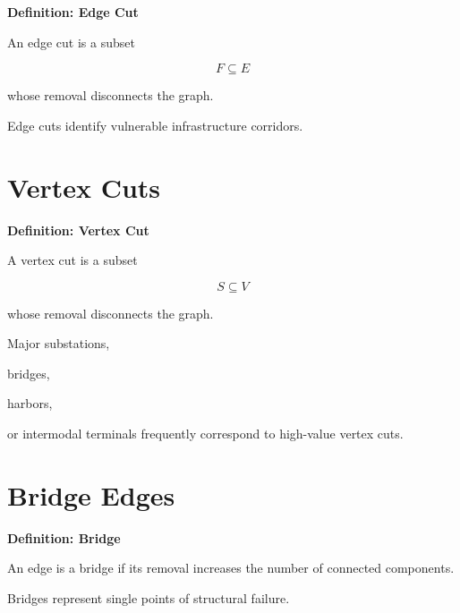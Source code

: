 \documentclass[11pt,fleqn]{book}
\numberwithin{equation}{chapter}
\newenvironment{definition}[1]
  {\begin{definitionEnv}
   \noindent\textbf{Definition: #1}\par\smallskip}
  {\end{definitionEnv}}
\theoremstyle{plain}
\theoremstyle{definition}
\theoremstyle{remark}
\begin{document}

\begin{definition}{Edge Cut}

An edge cut is a subset

\[
F\subseteq E
\]

whose removal disconnects the graph.

\end{definition}

Edge cuts identify vulnerable infrastructure corridors.


\section{Vertex Cuts}


\begin{definition}{Vertex Cut}

A vertex cut is a subset

\[
S\subseteq V
\]

whose removal disconnects the graph.

\end{definition}

Major substations,

bridges,

harbors,

or intermodal terminals frequently correspond to high-value vertex cuts.


\section{Bridge Edges}


\begin{definition}{Bridge}

An edge is a bridge if its removal increases the number of connected
components.

\end{definition}

Bridges represent single points of structural failure.

\end{document}
